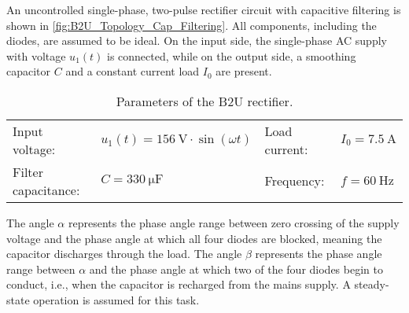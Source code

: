 

An uncontrolled single-phase, two-pulse rectifier circuit with capacitive filtering 
is shown in \autoref{fig:B2U_Topology_Cap_Filtering}.
All components, including the diodes, are assumed to be ideal. On the input side, 
the single-phase AC supply with voltage $u_\mathrm{1}(t)$ is connected, while on the output side, 
a smoothing capacitor $C$ and a constant current load $I_\mathrm{0}$ are present.



\begin{table}[ht]
    \centering  %
    \begin{tabular}{llll}
        \toprule
        
        Input voltage: &  $u_\mathrm{1}(t) = \SI{156}{\volt}\cdot \sin(\omega t)$ & Load current: & $I_{\mathrm{0}} = \SI{7.5}{\ampere}$ \\ 
        Filter capacitance: & $C = \SI{330}{\micro\farad}$  & Frequency: & $f= \SI{60}{\hertz}$ \\ 
        \bottomrule
    \end{tabular}
    \caption{Parameters of the B2U rectifier.}  
    \label{table:ex05_Task1_ParametersOfTheCircuit}
\end{table}

The angle $\alpha$ represents the phase angle range between zero crossing of the supply voltage and the phase angle
at which all four diodes are blocked, meaning the capacitor discharges through the load. The angle $\beta$ 
represents the phase angle range between $\alpha$ and the phase angle at which two of the four diodes begin to 
conduct, i.e., when the capacitor is recharged from the mains supply.
A steady-state operation is assumed for this task.

